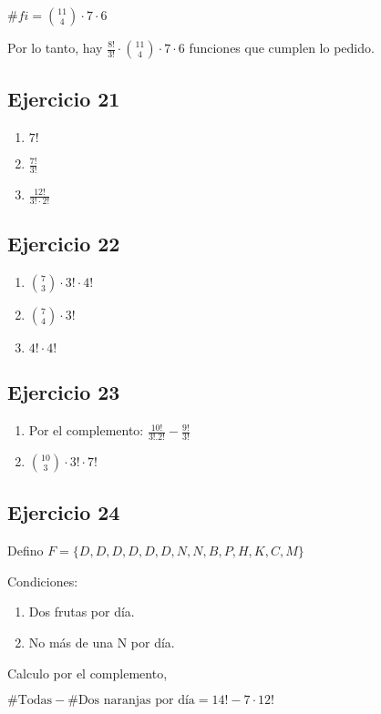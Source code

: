 $\#fi = \binom{11}{4} \cdot 7 \cdot 6$

Por lo tanto, hay $ \frac{8!}{3!} \cdot \binom{11}{4} \cdot 7 \cdot 6 $ funciones que cumplen lo pedido.

\subsection{Ejercicio 21}
\begin{enumerate}
    \item $ 7! $
    \item $ \frac{7!}{3!} $
    \item $ \frac{12!}{3!\cdot 2!} $
\end{enumerate}

\subsection{Ejercicio 22}
\begin{enumerate}
    \item $ \binom{7}{3} \cdot 3! \cdot 4! $
    \item $ \binom{7}{4} \cdot 3! $
    \item $ 4! \cdot 4! $
\end{enumerate}

\subsection{Ejercicio 23}
\begin{enumerate}
    \item Por el complemento: $ \frac{10!}{3! . 2!} - \frac{9!}{3!}$
    \item $ \binom{10}{3} \cdot 3! \cdot 7!$
\end{enumerate}

\subsection{Ejercicio 24}
Defino $ F = \{ D,D,D,D,D,D,N,N,B,P,H,K,C,M \} $

Condiciones:
\begin{enumerate}
    \item Dos frutas por día.
    \item No más de una N por día.
\end{enumerate}

Calculo por el complemento,

$ \# \text{Todas} - \# \text{Dos naranjas por día} = 14! - 7 \cdot 12!$

